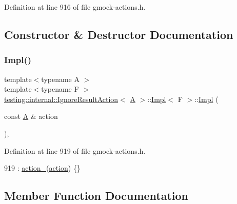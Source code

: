 Definition at line 916 of file gmock-\/actions.\+h.



\subsection{Constructor \& Destructor Documentation}
\mbox{\label{classtesting_1_1internal_1_1IgnoreResultAction_1_1Impl_a0252ee58746d81d31b92526b2336892e}} 
\subsubsection{\texorpdfstring{Impl()}{Impl()}}
{\footnotesize\ttfamily template$<$typename A $>$ \\
template$<$typename F $>$ \\
\hyperlink{classtesting_1_1internal_1_1IgnoreResultAction}{testing\+::internal\+::\+Ignore\+Result\+Action}$<$ \hyperlink{namespacetesting_a5e9134d655d2fc9323902348083282e7}{A} $>$\+::\hyperlink{classtesting_1_1internal_1_1IgnoreResultAction_1_1Impl}{Impl}$<$ F $>$\+::\hyperlink{classtesting_1_1internal_1_1IgnoreResultAction_1_1Impl}{Impl} (\begin{DoxyParamCaption}\item[{const \hyperlink{namespacetesting_a5e9134d655d2fc9323902348083282e7}{A} \&}]{action }\end{DoxyParamCaption})\hspace{0.3cm}{\ttfamily [inline]}, {\ttfamily [explicit]}}



Definition at line 919 of file gmock-\/actions.\+h.


\begin{DoxyCode}
919 : \hyperlink{classtesting_1_1internal_1_1IgnoreResultAction_1_1Impl_a31db8189338e8f4d5f8e21e95c0b0763}{action\_}(\hyperlink{namespaceupload_a675d13c979f1c720866d22ed1736f580}{action}) \{\}
\end{DoxyCode}


\subsection{Member Function Documentation}
\mbox{\label{classtesting_1_1internal_1_1IgnoreResultAction_1_1Impl_a9e4a21770e75deb8438e6ef633a638f5}} 
